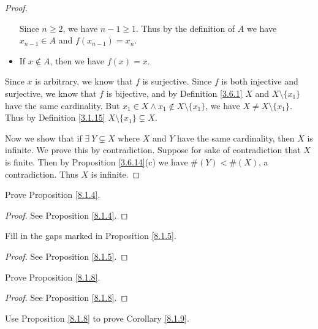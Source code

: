 \begin{proof}
\begin{itemize}
              Since \(n \geq 2\), we have \(n - 1 \geq 1\).
              Thus by the definition of \(A\) we have \(x_{n - 1} \in A\) and \(f(x_{n - 1}) = x_n\).
        \item If \(x \notin A\), then we have \(f(x) = x\).
    \end{itemize}
    Since \(x\) is arbitrary, we know that \(f\) is surjective.
    Since \(f\) is both injective and surjective, we know that \(f\) is bijective, and by Definition \ref{3.6.1} \(X\) and \(X \setminus \{x_1\}\) have the same cardinality.
    But \(x_1 \in X \land x_1 \notin X \setminus \{x_1\}\), we have \(X \neq X \setminus \{x_1\}\).
    Thus by Definition \ref{3.1.15} \(X \setminus \{x_1\} \subsetneq X\).

    Now we show that if \(\exists\ Y \subsetneq X\) where \(X\) and \(Y\) have the same cardinality, then \(X\) is infinite.
    We prove this by contradiction.
    Suppose for sake of contradiction that \(X\) is finite.
    Then by Proposition \ref{3.6.14}(c) we have \(\#(Y) < \#(X)\), a contradiction.
    Thus \(X\) is infinite.
\end{proof}

\begin{exercise}\label{ex 8.1.2}
    Prove Proposition \ref{8.1.4}.
\end{exercise}

\begin{proof}
    See Proposition \ref{8.1.4}.
\end{proof}

\begin{exercise}\label{ex 8.1.3}
    Fill in the gaps marked in Proposition \ref{8.1.5}.
\end{exercise}

\begin{proof}
    See Proposition \ref{8.1.5}.
\end{proof}

\begin{exercise}\label{ex 8.1.4}
    Prove Proposition \ref{8.1.8}.
\end{exercise}

\begin{proof}
    See Proposition \ref{8.1.8}.
\end{proof}

\begin{exercise}\label{ex 8.1.5}
    Use Proposition \ref{8.1.8} to prove Corollary \ref{8.1.9}.
\end{exercise}

